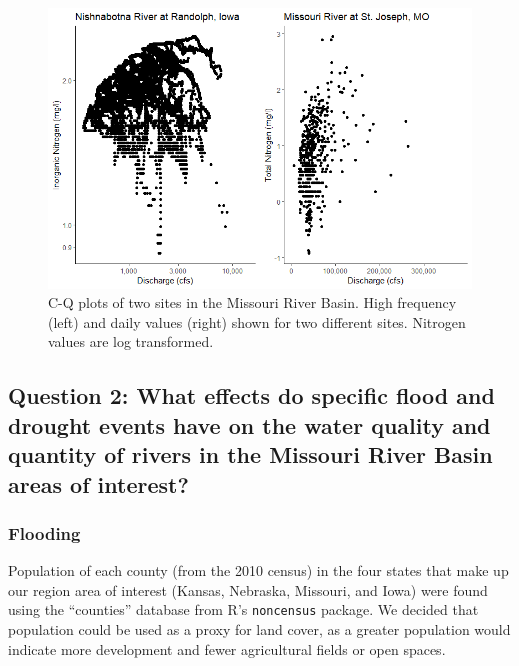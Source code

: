 \documentclass[12pt,]{article}
\makeatletter
\def\maxwidth{\ifdim\Gin@nat@width>\linewidth\linewidth\else\Gin@nat@width\fi}
\makeatother
\begin{document}
\begin{figure}[H]
\includegraphics[width=\maxwidth]{../Figures/CQplots} \caption{\label{fig:CQplot} C-Q plots of two sites in the Missouri River Basin. High frequency (left) and daily values (right) shown for two different sites. Nitrogen values are log transformed.}\label{fig:CQplot}
\end{figure}

\hypertarget{question-2-what-effects-do-specific-flood-and-drought-events-have-on-the-water-quality-and-quantity-of-rivers-in-the-missouri-river-basin-areas-of-interest}{%
\subsection{Question 2: What effects do specific flood and drought
events have on the water quality and quantity of rivers in the Missouri
River Basin areas of
interest?}\label{question-2-what-effects-do-specific-flood-and-drought-events-have-on-the-water-quality-and-quantity-of-rivers-in-the-missouri-river-basin-areas-of-interest}}

\hypertarget{flooding}{%
\subsubsection{Flooding}\label{flooding}}

Population of each county (from the 2010 census) in the four states that
make up our region area of interest (Kansas, Nebraska, Missouri, and
Iowa) were found using the ``counties'' database from R's
\texttt{noncensus} package. We decided that population could be used as
a proxy for land cover, as a greater population would indicate more
development and fewer agricultural fields or open spaces.
\end{document}

